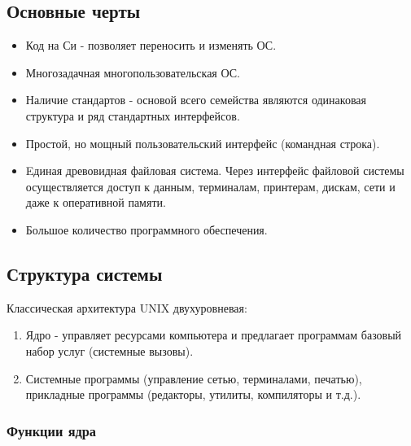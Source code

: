 \subsection{Основные черты}

\begin{itemize}
\item  Код на Си - позволяет переносить и изменять ОС.
\item  Многозадачная многопользовательская ОС.
\item  Наличие стандартов - основой всего семейства являются одинаковая структура и ряд стандартных интерфейсов.
\item  Простой, но мощный пользовательский интерфейс (командная строка).
\item  Eдиная древовидная файловая система. Через интерфейс файловой системы осуществляется доступ к данным, терминалам, принтерам, дискам, сети и даже к оперативной памяти.
\item  Большое количество программного обеспечения.
\end{itemize}

\subsection{Структура системы}

Классическая архитектура UNIX двухуровневая:
\begin{enumerate}
\item  Ядро - управляет ресурсами компьютера и предлагает программам базовый набор услуг (системные вызовы).
\item  Системные программы (управление сетью, терминалами, печатью), прикладные программы (редакторы, утилиты, компиляторы и т.д.). 
\end{enumerate}

\subsubsection{Функции ядра}

